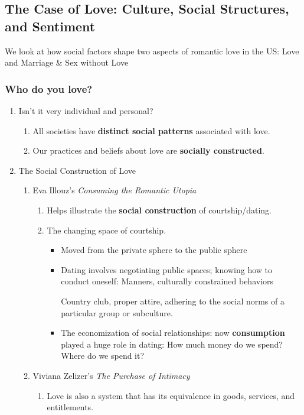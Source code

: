 \documentclass[12pt,a4paper]{article}
\begin{document}
\subsection{The Case of Love: Culture, Social Structures, and Sentiment}
We look at how social factors shape two aspects of romantic love in the US: Love and Marriage \& Sex without Love
\subsubsection{Who do you love?}
\begin{enumerate}
	\item Isn't it very individual and personal? 
	\begin{enumerate}
		\item All societies have \textbf{distinct social patterns} associated with love.
		\item Our practices and beliefs about love are \textbf{socially constructed}.
	\end{enumerate}
	\item The Social Construction of Love
	\begin{enumerate}
		\item Eva Illouz's \textit{Consuming the Romantic Utopia}
		\begin{enumerate}
			\item Helps illustrate the \textbf{social construction} of courtship/dating.
			\item The changing space of courtship.
			\begin{itemize}
				\item Moved from the private sphere to the public sphere
				\item Dating involves negotiating public spaces; knowing how to conduct oneself: Manners, culturally constrained behaviors
				\begin{eg}
					Country club, proper attire, adhering to the social norms of a particular group or subculture. 
				\end{eg}
				\item The economization of social relationships: now \textbf{consumption} played a huge role in dating: How much money do we spend? Where do we spend it? 
			\end{itemize}
		\end{enumerate}
		\item Viviana Zelizer's \textit{The Purchase of Intimacy}
		\begin{enumerate}
			\item Love is also a system that has its equivalence in goods, services, and entitlements. 

\end{enumerate}
\end{enumerate}
\end{enumerate}
\end{document}
